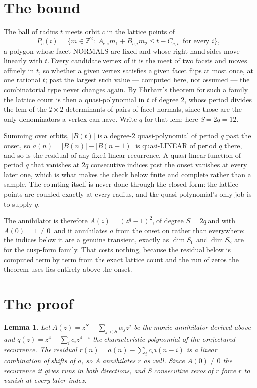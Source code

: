 \documentclass[11pt,a4paper]{article}
\theoremstyle{plain}
\newtheorem{lemma}[theorem]{Lemma}
\theoremstyle{definition}
\begin{document}
\section{The bound}

The ball of radius $t$ meets orbit $c$ in the lattice points of
\[
P_c(t)=\{m\in\mathbb{Z}^2:\;A_{c,i}m_1+B_{c,i}m_2\le t-C_{c,i}\ \text{ for every } i\},
\]
a polygon whose facet NORMALS are fixed and whose right-hand sides move linearly with $t$.
Every candidate vertex of it is the meet of two facets and moves affinely in $t$, so whether a
given vertex satisfies a given facet flips at most once, at one rational $t$; past the largest
such value --- computed here, not assumed --- the combinatorial type never changes again. By
Ehrhart's theorem for such a family the lattice count is then a quasi-polynomial in $t$ of
degree $2$, whose period divides the lcm of the $2\times2$ determinants of pairs of facet
normals, since those are the only denominators a vertex can have. Write $q$ for that lcm;
here $S=2q=12$.

Summing over orbits, $|B(t)|$ is a degree-$2$ quasi-polynomial of period $q$ past the onset,
so $a(n)=|B(n)|-|B(n-1)|$ is quasi-LINEAR of period $q$ there, and so is the residual of any
fixed linear recurrence. A quasi-linear function of period $q$ that vanishes at $2q$
consecutive indices past the onset vanishes at every later one, which is what makes the check
below finite and complete rather than a sample. The counting itself is never done through the
closed form: the lattice points are counted exactly at every radius, and the quasi-polynomial's
only job is to supply $q$.

The annihilator is therefore $A(z)=(z^{q}-1)^2$, of degree $S=2q$ and with $A(0)=1\ne0$, and
it annihilates $a$ from the onset on rather than everywhere: the indices below it are a
genuine transient, exactly as $\dim S_0$ and $\dim S_2$ are for the cusp-form family. That
costs nothing, because the residual below is computed term by term from the exact lattice
count and the run of zeros the theorem uses lies entirely above the onset.

\section{The proof}

\begin{lemma}\label{lem:crit}
Let $A(z)=z^S-\sum_{j<S}\alpha_jz^{j}$ be the monic annihilator derived above and
$q(z)=z^{4}-\sum_ic_iz^{4-i}$ the characteristic polynomial of the conjectured
recurrence. The residual $r(n)=a(n)-\sum_ic_ia(n-i)$ is a linear combination of shifts of $a$,
so $A$ annihilates $r$ as well. Since $A(0)\ne0$ the recurrence it gives runs in both
directions, and $S$ consecutive zeros of $r$ force $r$ to vanish at every later index.
\end{lemma}
\end{document}
